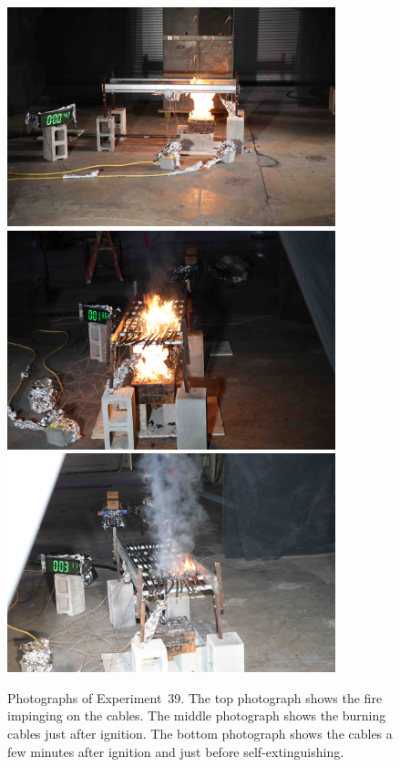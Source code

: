\begin{figure}[p]
\centering
\includegraphics[height=2.50in]{../FIGURES/Test_39_side} \\ \vspace{0.1in}
\includegraphics[height=2.50in]{../FIGURES/Test_39_1_min_36_s} \\ \vspace{0.1in}
\includegraphics[height=2.50in]{../FIGURES/Test_39_3_min_11_s}
\caption[Photographs of Experiment~39]{Photographs of Experiment~39. The top photograph shows the fire impinging on the cables. The middle photograph shows the burning cables just after ignition. The bottom photograph shows the cables a few minutes after ignition and just before self-extinguishing.}
\label{fig:Test_39_photos}
\end{figure}


